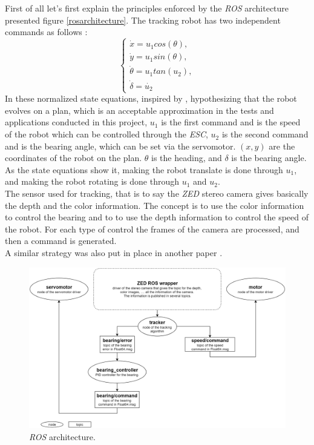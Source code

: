		First of all let's first explain the principles enforced
		by the \textit{ROS} architecture presented 
		figure \vref{rosarchitecture}. The tracking robot
		has two independent commands as follows :
		\begin{equation}
		\begin{cases}
			\dot{x} = u_{1}cos(\theta),\\
			\dot{y} = u_{1}sin(\theta),\\
			\dot{\theta} = u_1tan(u_2),\\
			\dot{\delta} = \dot{u_{2}}	
		\end{cases}
		\end{equation}
		In these normalized state equations, inspired by \cite{model},
		hypothesizing that the robot evolves on a plan, which is 
		an acceptable approximation in the tests and applications conducted in this 
		project, $u_{1}$ is the first command and is the speed of the 
		robot which can be controlled through the \textit{ESC}, $u_{2}$
		is the second command and is the bearing angle, which 
		can be set via the servomotor. $(x,y)$ are
		the coordinates of the robot on the plan. $\theta$ is the heading, and 
		$\delta$ is the bearing angle. As the state equations show it, 
		making the robot translate is done through $u_1$, and making 
		the robot rotating is done through $u_1$ and $u_2$.
		\\\indent The sensor used for tracking, that is to say
		the \textit{ZED} stereo camera gives basically the depth and
		the color information. The concept is 
		to use the color information to control the bearing and to 
		to use the depth information to control the speed of the 
		robot. For each type of control the frames of the 
		camera are processed, and then 
		a command is generated.
		\\\indent A similar strategy was also put
		in place in another paper \cite{personfollowing}.
		
		\FloatBarrier
		
		\begin{figure}[!htbp]
			\centering
			\includegraphics[width=1.0\columnwidth, height = 0.7\columnwidth]{imgs/ros.png}
			\caption{\textit{ROS} architecture.}
			\label{rosarchitecture}
		\end{figure}
		
